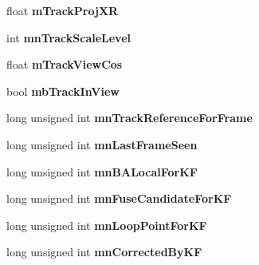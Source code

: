 \begin{DoxyCompactItemize}
\item 
\hypertarget{classORB__SLAM2_1_1MapPoint_a4f0a0671a3587e2aac0708eed07c5170}{float {\bfseries m\-Track\-Proj\-X\-R}}\label{classORB__SLAM2_1_1MapPoint_a4f0a0671a3587e2aac0708eed07c5170}

\item 
\hypertarget{classORB__SLAM2_1_1MapPoint_aac515bf003cea5f99737d13475c46816}{int {\bfseries mn\-Track\-Scale\-Level}}\label{classORB__SLAM2_1_1MapPoint_aac515bf003cea5f99737d13475c46816}

\item 
\hypertarget{classORB__SLAM2_1_1MapPoint_a728107bc670ba47d79bad5ba288256d6}{float {\bfseries m\-Track\-View\-Cos}}\label{classORB__SLAM2_1_1MapPoint_a728107bc670ba47d79bad5ba288256d6}

\item 
\hypertarget{classORB__SLAM2_1_1MapPoint_a0187350fa3fddd0bf89ccf354acb4766}{bool {\bfseries mb\-Track\-In\-View}}\label{classORB__SLAM2_1_1MapPoint_a0187350fa3fddd0bf89ccf354acb4766}

\item 
\hypertarget{classORB__SLAM2_1_1MapPoint_a19152183cfddc71b63650175def6aec7}{long unsigned int {\bfseries mn\-Track\-Reference\-For\-Frame}}\label{classORB__SLAM2_1_1MapPoint_a19152183cfddc71b63650175def6aec7}

\item 
\hypertarget{classORB__SLAM2_1_1MapPoint_aea3a63ce27fc39e536a6ceef7c1f3473}{long unsigned int {\bfseries mn\-Last\-Frame\-Seen}}\label{classORB__SLAM2_1_1MapPoint_aea3a63ce27fc39e536a6ceef7c1f3473}

\item 
\hypertarget{classORB__SLAM2_1_1MapPoint_ad4da26d02aa54a3e0be6a09e90fa39ec}{long unsigned int {\bfseries mn\-B\-A\-Local\-For\-K\-F}}\label{classORB__SLAM2_1_1MapPoint_ad4da26d02aa54a3e0be6a09e90fa39ec}

\item 
\hypertarget{classORB__SLAM2_1_1MapPoint_aedba463c6440c2b448e9ec21acd58b9a}{long unsigned int {\bfseries mn\-Fuse\-Candidate\-For\-K\-F}}\label{classORB__SLAM2_1_1MapPoint_aedba463c6440c2b448e9ec21acd58b9a}

\item 
\hypertarget{classORB__SLAM2_1_1MapPoint_a44172716cac5a56004a60d165de8cfa2}{long unsigned int {\bfseries mn\-Loop\-Point\-For\-K\-F}}\label{classORB__SLAM2_1_1MapPoint_a44172716cac5a56004a60d165de8cfa2}

\item 
\hypertarget{classORB__SLAM2_1_1MapPoint_a86626462be01ad9a133dca0f5b49e688}{long unsigned int {\bfseries mn\-Corrected\-By\-K\-F}}\label{classORB__SLAM2_1_1MapPoint_a86626462be01ad9a133dca0f5b49e688}


\end{DoxyCompactItemize}
